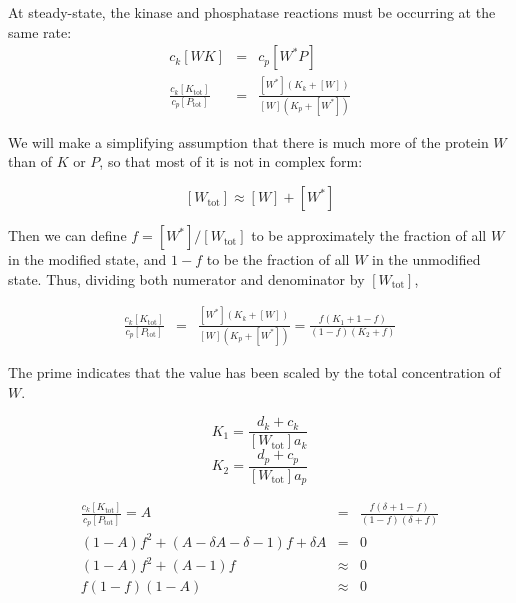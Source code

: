 \documentclass{article}
\begin{document}
At steady-state, the kinase and phosphatase reactions must be occurring at the same rate:
\begin{eqnarray*}
c_k \left[ WK \right] & = & c_p \left[ W^*P \right]\\
\frac{ c_k \left[ K_{\textrm{tot}} \right] }{ c_p \left[ P_{\textrm{tot}} \right]} & = & \frac{\left[ W^* \right] \left(   K_k + \left[ W \right] \right)}{\left[ W \right] \left( K_p + \left[ W^* \right] \right)}
\end{eqnarray*}

We will make a simplifying assumption that there is much more of the protein $W$ than of $K$ or $P$, so that most of it is not in complex form:

\[ \left[ W_{\textrm{tot}} \right] \approx \left[ W \right] + \left[ W^* \right] \]

Then we can define $f = \left[ W^* \right] /\left[ W_{\textrm{tot}} \right]$ to be approximately the fraction of all $W$ in the modified state, and $1-f$ to be the fraction of all $W$ in the unmodified state. Thus, dividing both numerator and denominator by $\left[ W_{\textrm{tot}} \right] $,

\begin{eqnarray*}
\frac{ c_k \left[ K_{\textrm{tot}} \right] }{ c_p \left[ P_{\textrm{tot}} \right]} & = & \frac{\left[ W^* \right] \left(   K_k + \left[ W \right] \right)}{\left[ W \right] \left( K_p + \left[ W^* \right] \right)} = \frac{f \left(   K_1 + 1 - f \right)}{\left( 1 - f \right)   \left( K_2 + f \right)}
\end{eqnarray*}

The prime indicates that the value has been scaled by the total concentration of $W$.

\[ K_1 = \frac{d_k + c_k}{\left[ W_{\textrm{tot}} \right] a_k} \]
\[ K_2 = \frac{d_p + c_p}{\left[ W_{\textrm{tot}} \right] a_p} \]

\begin{eqnarray*}
\frac{ c_k \left[ K_{\textrm{tot}} \right] }{ c_p \left[ P_{\textrm{tot}} \right]} = A & = & \frac{f \left(   \delta + 1 - f \right)}{\left( 1 - f \right)   \left( \delta + f \right)}\\
\left( 1- A \right)f^2 + \left(A - \delta A - \delta -1 \right)f + \delta A & = & 0\\
\left( 1- A \right)f^2 + \left(A -1 \right)f & \approx & 0\\
f \left(1 - f \right) \left(1 - A \right) & \approx & 0
\end{eqnarray*}
\end{document}
